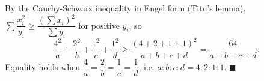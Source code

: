 By the Cauchy-Schwarz inequality in Engel form (Titu's lemma), $\sum\dfrac{x_i^2}{y_i}\ge\dfrac{(\sum x_i)^2}{\sum y_i}$ for positive $y_i$, so
\[
\dfrac{4^2}{a}+\dfrac{2^2}{b}+\dfrac{1^2}{c}+\dfrac{1^2}{d}\ge\dfrac{(4+2+1+1)^2}{a+b+c+d}=\dfrac{64}{a+b+c+d}.
\]
Equality holds when $\dfrac{4}{a}=\dfrac{2}{b}=\dfrac{1}{c}=\dfrac{1}{d}$, i.e. $a:b:c:d=4:2:1:1$. $\blacksquare$
